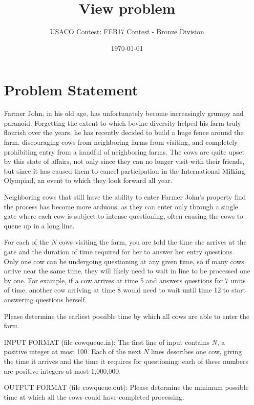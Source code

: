\documentclass[12pt]{article}
\title{View problem}
\author{USACO Contest: FEB17 Contest - Bronze Division}
\date{\today}
\begin{document}
\maketitle

\section*{Problem Statement}

Farmer John, in his old age, has unfortunately become increasingly grumpy and
paranoid.  Forgetting the extent to which bovine diversity helped his farm truly
flourish over the years, he has recently decided to build a huge fence around
the farm, discouraging cows from neighboring farms from visiting, and completely
prohibiting entry from  a handful of neighboring farms.  The cows are quite
upset by this state of affairs, not only since they can no longer visit with
their friends, but since it has caused them to cancel participation in the
International Milking Olympiad, an event to which they look forward all year.

Neighboring cows that still have the ability to enter Farmer John's property
find the process has become more arduous, as they can enter only through a
single gate where each cow is subject to intense questioning, often causing the
cows to queue up in a long line.

For each of the $N$ cows visiting the farm, you are told the time she arrives 
at the gate and the duration of time required for her to answer her entry
questions. Only one cow can be undergoing questioning at any given time, so if
many cows arrive near the same time, they will likely need to wait in line to be
processed one by one.  For example, if a cow arrives at time 5 and answers
questions for 7 units of time, another cow arriving at time 8 would need to wait
until time 12 to start answering questions herself.

Please determine the earliest possible time by which all cows are able to enter
the farm.

INPUT FORMAT (file cowqueue.in):
The first line of input contains $N$, a positive integer at most 100. Each of
the next $N$ lines describes one cow, giving the time it arrives and the time it
requires for questioning; each of these numbers are positive integers at most
1,000,000.

OUTPUT FORMAT (file cowqueue.out):
Please determine the minimum possible time at which all the cows could have
completed processing.
\end{document}
